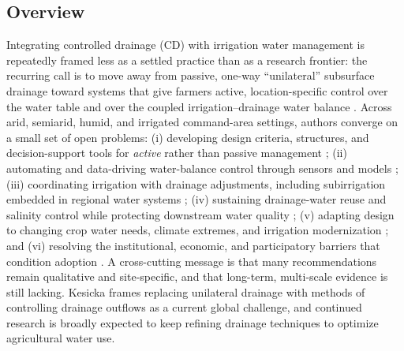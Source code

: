 \subsection{Overview}
Integrating controlled drainage (CD) with irrigation water management is repeatedly framed less as a settled practice than as a research frontier: the recurring call is to move away from passive, one-way ``unilateral'' subsurface drainage toward systems that give farmers active, location-specific control over the water table and over the coupled irrigation--drainage water balance \parencite{Ayars2006b,Kesicka2023b,Ritzema2023}. Across arid, semiarid, humid, and irrigated command-area settings, authors converge on a small set of open problems: (i) developing design criteria, structures, and decision-support tools for \emph{active} rather than passive management \parencite{Ayars2006b,Youssef2023,Saadat2017}; (ii) automating and data-driving water-balance control through sensors and models \parencite{Youssef2023,Ikonen2023,Isomäki2024}; (iii) coordinating irrigation with drainage adjustments, including subirrigation embedded in regional water systems \parencite{Wahba2005,deWit2022,deWit2024}; (iv) sustaining drainage-water reuse and salinity control while protecting downstream water quality \parencite{WESTCOT1988,Sharma1998,Ayars2015}; (v) adapting design to changing crop water needs, climate extremes, and irrigation modernization \parencite{Rui2024,Ritzema2007,Ziaeifar2025}; and (vi) resolving the institutional, economic, and participatory barriers that condition adoption \parencite{Ritzema2011,Castellano2019,Qureshi2008}. A cross-cutting message is that many recommendations remain qualitative and site-specific, and that long-term, multi-scale evidence is still lacking. Kesicka \textcite{Kesicka2023b} frames replacing unilateral drainage with methods of controlling drainage outflows as a current global challenge, and continued research is broadly expected to keep refining drainage techniques to optimize agricultural water use.

